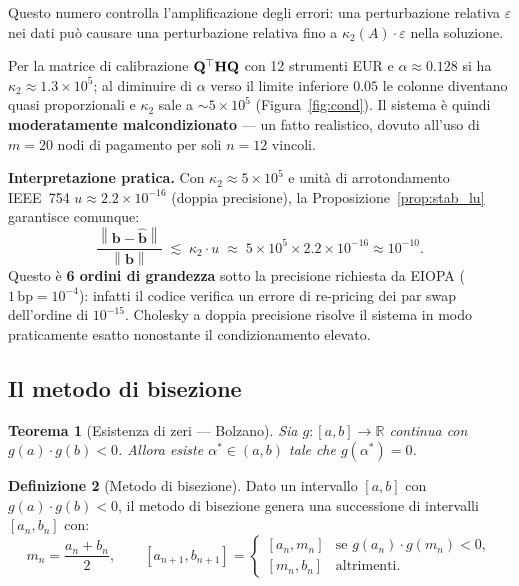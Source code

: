 \documentclass[11pt,a4paper]{article}
\theoremstyle{plain}
\newtheorem{teorema}{Teorema}[section]
\theoremstyle{definition}
\newtheorem{definizione}[teorema]{Definizione}
\theoremstyle{remark}
\newcommand{\R}{\mathbb{R}}
\newcommand{\bfb}{\mathbf{b}}
\newcommand{\Hmat}{\mathbf{H}}
\newcommand{\Qmat}{\mathbf{Q}}
\newcommand{\transp}{^{\mskip-1mu\top}}
\newcommand{\norm}[1]{\left\lVert #1 \right\rVert}
\begin{document}
Questo numero controlla l'amplificazione degli errori: una perturbazione relativa
$\varepsilon$ nei dati pu\`o causare una perturbazione relativa fino a
$\kappa_2(A)\cdot\varepsilon$ nella soluzione.

\begin{keybox}
Per la matrice di calibrazione $\Qmat\transp\Hmat\Qmat$ con 12 strumenti EUR e
$\alpha \approx 0.128$ si ha $\kappa_2 \approx 1.3\times 10^{5}$; al diminuire di
$\alpha$ verso il limite inferiore $0.05$ le colonne diventano quasi proporzionali
e $\kappa_2$ sale a $\sim 5\times 10^{5}$ (Figura~\ref{fig:cond}). Il sistema è
quindi \textbf{moderatamente malcondizionato} --- un fatto realistico, dovuto
all'uso di $m=20$ nodi di pagamento per soli $n=12$ vincoli.

\smallskip
\textbf{Interpretazione pratica.}
Con $\kappa_2 \approx 5\times 10^{5}$ e unit\`a di arrotondamento IEEE~754
$u \approx 2.2\times 10^{-16}$ (doppia precisione), la
Proposizione~\ref{prop:stab_lu} garantisce comunque:
\[
  \frac{\norm{\bfb - \hat{\bfb}}}{\norm{\bfb}}
  \;\lesssim\; \kappa_2\cdot u
  \;\approx\; 5\times 10^{5} \times 2.2\times 10^{-16} \approx 10^{-10}.
\]
Questo \`e \textbf{6 ordini di grandezza} sotto la precisione richiesta da EIOPA
($1\,\mathrm{bp} = 10^{-4}$): infatti il codice verifica un errore di re-pricing
dei par swap dell'ordine di $10^{-15}$. Cholesky a doppia precisione risolve il
sistema in modo praticamente esatto nonostante il condizionamento elevato.
\end{keybox}

\subsection{Il metodo di bisezione}
\label{sec:bisezione}

\begin{teorema}[Esistenza di zeri --- Bolzano]
Sia $g: [a,b] \to \R$ continua con $g(a)\cdot g(b) < 0$. Allora esiste
$\alpha^* \in (a,b)$ tale che $g(\alpha^*) = 0$.
\end{teorema}

\begin{definizione}[Metodo di bisezione]
Dato un intervallo $[a,b]$ con $g(a)\cdot g(b) < 0$, il metodo di bisezione
genera una successione di intervalli $[a_n, b_n]$ con:
\[
  m_n = \frac{a_n + b_n}{2}, \qquad
  [a_{n+1}, b_{n+1}] = \begin{cases}
    [a_n, m_n] & \text{se } g(a_n)\cdot g(m_n) < 0,\\
    [m_n, b_n] & \text{altrimenti.}
  \end{cases}
\]
\end{definizione}
\end{document}
